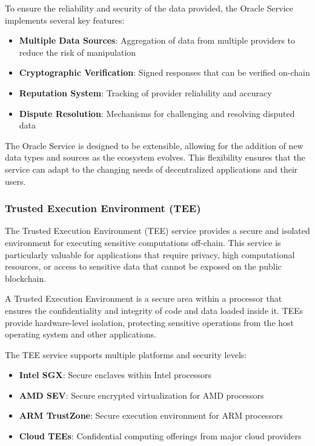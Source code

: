 To ensure the reliability and security of the data provided, the Oracle Service implements several key features:

\begin{itemize}
    \item \textbf{Multiple Data Sources}: Aggregation of data from multiple providers to reduce the risk of manipulation
    \item \textbf{Cryptographic Verification}: Signed responses that can be verified on-chain
    \item \textbf{Reputation System}: Tracking of provider reliability and accuracy
    \item \textbf{Dispute Resolution}: Mechanisms for challenging and resolving disputed data
\end{itemize}

The Oracle Service is designed to be extensible, allowing for the addition of new data types and sources as the ecosystem evolves. This flexibility ensures that the service can adapt to the changing needs of decentralized applications and their users.

\subsubsection{Trusted Execution Environment (TEE)}
\label{subsubsec:tee}

The Trusted Execution Environment (TEE) service provides a secure and isolated environment for executing sensitive computations off-chain. This service is particularly valuable for applications that require privacy, high computational resources, or access to sensitive data that cannot be exposed on the public blockchain.



\begin{definition}
A Trusted Execution Environment is a secure area within a processor that ensures the confidentiality and integrity of code and data loaded inside it. TEEs provide hardware-level isolation, protecting sensitive operations from the host operating system and other applications.
\end{definition}

The TEE service supports multiple platforms and security levels:

\begin{itemize}
    \item \textbf{Intel SGX}: Secure enclaves within Intel processors
    \item \textbf{AMD SEV}: Secure encrypted virtualization for AMD processors
    \item \textbf{ARM TrustZone}: Secure execution environment for ARM processors
    \item \textbf{Cloud TEEs}: Confidential computing offerings from major cloud providers
\end{itemize}

